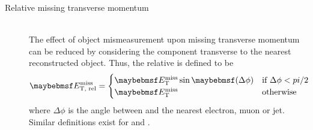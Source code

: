 \begin{description}
\item[Relative missing transverse momentum] \hfill \\
	The effect of object mismeasurement upon missing transverse momentum can be reduced 
	by considering the component transverse to the nearest reconstructed object. Thus, 
	the relative \met is defined to be
	\begin{equation}
		\metrel = 
		\begin{cases}
			\met\sin\parenths{\Delta\phi} & \text{if~} \Delta\phi < \pi/2 \\
			\met & \text{otherwise}
		\end{cases}
	\end{equation}
	where $\Delta\phi$ is the angle between \metvec and the nearest electron, muon or jet.
	Similar definitions exist for \trackmetrel and \corrtrackmetrel.

\end{description}
